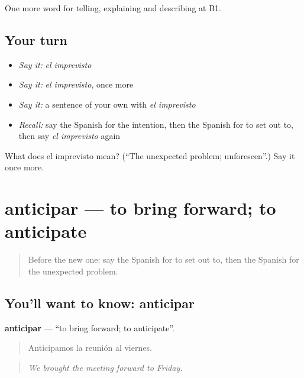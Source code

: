 \begin{grammarlens}[title={What you've built}]
One more word for telling, explaining and describing at B1.
\end{grammarlens}

\subsection*{Your turn}
\begin{itemize}
\raggedright
  \item \emph{Say it:} \emph{el imprevisto}
  \item \emph{Say it:} \emph{el imprevisto}, once more
  \item \emph{Say it:} a sentence of your own with \emph{el imprevisto}
  \item \emph{Recall:} say the Spanish for the intention, then the Spanish for to set out to, then say \emph{el imprevisto} again
\end{itemize}

\begin{tcolorbox}[breakable,colback=teal!4,colframe=teal!35!black,title={Before you move on}]
What does el imprevisto mean? (\textquotedblleft{}The unexpected problem; unforeseen\textquotedblright{}.) Say it once more.
\end{tcolorbox}
\section[anticipar]{anticipar — to bring forward; to anticipate}

\label{lesson:ES-C616-anticipar}



\begin{quote}
Before the new one: say the Spanish for to set out to, then the Spanish for the unexpected problem.
\end{quote}

\subsection*{You'll want to know: anticipar}
\textbf{anticipar} — \textquotedblleft{}to bring forward; to anticipate\textquotedblright{}.

\begin{quote}
Anticipamos la reunión al viernes.
\end{quote}

\begin{quote}
\emph{We brought the meeting forward to Friday.}
\end{quote}

